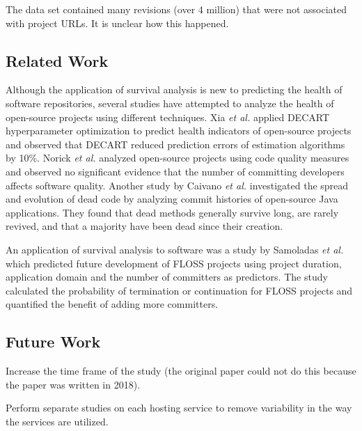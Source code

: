 \documentclass[acmconf]{acmart}
\begin{document}
The data set contained many revisions (over 4 million) that were not associated with project URLs.
It is unclear how this happened.


\subsection{Related Work} \label{related}

Although the application of survival analysis is new to predicting the health of software repositories, several studies have attempted to analyze the health of open-source projects using different techniques. 
Xia \emph{et al.} \cite{xia2020predicting} applied DECART hyperparameter optimization to predict health indicators of open-source projects and observed that DECART reduced prediction errors of estimation algorithms by 10\%. 
Norick \emph{et al.} \cite{norick2010effects} analyzed open-source projects using code quality measures and observed no significant evidence that the number of committing developers affects software quality. 
Another study by Caivano \emph{et al.} \cite{caivano2021exploratory} investigated the spread and evolution of dead code by analyzing commit histories of open-source Java applications. 
They found that dead methods generally survive long, are rarely revived, and that a majority have been dead since their creation.

An application of survival analysis to software was a study by Samoladas \emph{et al.} \cite{samoladas2010survival} which predicted future development of FLOSS projects using project duration, application domain and the number of committers as predictors. 
The study calculated the probability of termination or continuation for FLOSS projects and quantified the benefit of adding more committers.

\subsection{Future Work} \label{future}

Increase the time frame of the study (the original paper could not do this because the paper was written in 2018).

Perform separate studies on each hosting service to remove variability in the way the services are utilized.
\end{document}
